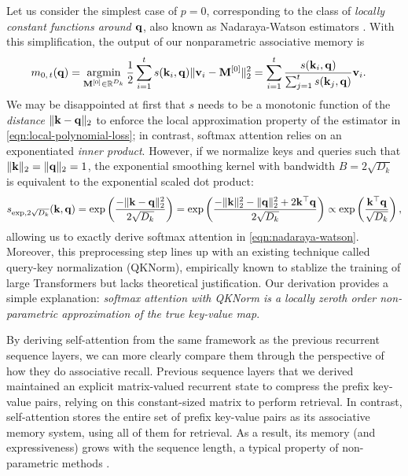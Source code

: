 \documentclass[notitlepage, 11pt]{article}
\newcommand*{\dkey}{{D_k}}
\begin{document}
Let us consider the simplest case of $p=0$, corresponding to the class of \emph{locally constant functions around $\mathbf{q}$}, also known as Nadaraya-Watson estimators \citep{Fan2018LocalPolynomialModelling,Zhang2024AnalysisAttentionLens,Goel2024CanTransformerRepresent}.
With this simplification, the output of our nonparametric associative memory is
\begin{align}
    m_{0,\, t}(\qbf) &= \argmin_{\Mbf^{[0]}\in \reals^\dkey} \frac{1}{2}\sum_{i=1}^t s(\kbf_i, \qbf) \norm{\vbf_i - \Mbf^{[0]}}_2^2 = \sum_{i=1}^t \frac{s(\kbf_i, \qbf)}{\sum_{j=1}^t s(\kbf_j, \qbf)} \vbf_i.\label{eqn:nadaraya-watson}
\end{align}
We may be disappointed at first that $s$ needs to be a monotonic function of the \emph{distance} $\lVert\mathbf{k} - \mathbf{q}\rVert_2$ to enforce the local approximation property of the estimator in \autoref{eqn:local-polynomial-loss}; in contrast, softmax attention relies on an exponentiated \emph{inner product}.
However, if we normalize keys and queries such that $\lVert\mathbf{k}\rVert_2=\lVert\mathbf{q}\rVert_2=1$, the exponential smoothing kernel with bandwidth $B=2\sqrt{\dkey}$ is equivalent to the exponential scaled dot product:
\begin{align}
    s_{\text{exp}, 2\sqrt\dkey}(\kbf, \qbf) =\exp\left(\frac{-\norm{\kbf - \qbf}_2^2}{2\sqrt{\dkey}}\right) = \exp\left(\frac{-\norm{\kbf}_2^2 - \norm{\qbf}_2^2 + 2\kbf\transpose\qbf}{2\sqrt{\dkey}}\right) \propto \exp\left(\frac{\kbf\transpose\qbf}{\sqrt{\dkey}}\right),
\end{align}
allowing us to exactly derive softmax attention in \autoref{eqn:nadaraya-watson}.
Moreover, this preprocessing step lines up with an existing technique called query-key normalization (QKNorm), empirically known to stablize the training of large Transformers \citep{Dehghani2023ScalingVisionTransformers,Wortsman2023SmallscaleProxiesLargescale} but lacks theoretical justification.
Our derivation provides a simple explanation: \emph{softmax attention with QKNorm is a locally zeroth order non-parametric approximation of the true key-value map}.

By deriving self-attention from the same framework as the previous recurrent sequence layers, we can more clearly compare them through the perspective of how they do associative recall.
Previous sequence layers that we derived maintained an explicit matrix-valued recurrent state to compress the prefix key-value pairs, relying on this constant-sized matrix to perform retrieval.
In contrast, self-attention stores the entire set of prefix key-value pairs as its associative memory system, using all of them for retrieval.
As a result, its memory (and expressiveness) grows with the sequence length, a typical property of non-parametric methods \citep{Wang2019ExactGaussianProcesses,Wasserman2006AllNonparametricStatistics}.
\end{document}
